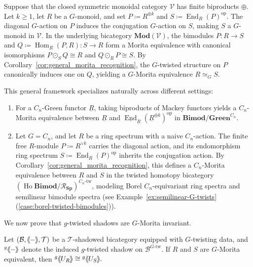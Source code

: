 \documentclass[11pt,oneside]{amsart}
\DeclareMathOperator{\Hom}{Hom}
\DeclareMathOperator{\Ho}{Ho}
\DeclareMathOperator{\End}{End}
\numberwithin{equation}{section}
\numberwithin{figure}{section}
\theoremstyle{plain}
\theoremstyle{definition}
\theoremstyle{remark}
\newcommand{\shspace}{\hspace{.5mm}} %
\newcommand{\sh}[1]{{\ensuremath{\shspace\hspace{1mm}\makebox[-1mm]{$\langle$}\makebox[0mm]{$\langle$}\hspace{1mm}{#1}\makebox[1mm]{$\rangle$}\makebox[0mm]{$\rangle$}\shspace}}}
\begin{document}
\begin{example}\label{ex:general_morita_biproduct}
Suppose that the closed symmetric monoidal category \(\mathcal V\) has finite biproducts \(\oplus\). Let \(k\geq 1\), let \(R\) be a \(G\)-monoid, and set \(P\coloneqq R^{\oplus k}\) and \(S\coloneqq \End_R(P)^{\mathrm{op}}\). The diagonal \(G\)-action on \(P\) induces the conjugation \(G\)-action on \(S\), making \(S\) a \(G\)-monoid in \(\mathcal V\). In the underlying bicategory \(\mathbf{Mod}(\mathcal V)\), the bimodules \(P\colon R\to S\) and \(Q\coloneqq\Hom_R(P,R)\colon S\to R\) form a Morita equivalence with canonical isomorphisms \(P\odot_S Q\cong R\) and \(Q\odot_R P\cong S\). By Corollary~\ref{cor:general_morita_recognition}, the \(G\)-twisted structure on \(P\) canonically induces one on \(Q\), yielding a \(G\)-Morita equivalence \(R \simeq_G S\).
\end{example}

This general framework specializes naturally across different settings:

\begin{enumerate}
\item  For a \(C_n\)-Green functor \(\underline{R}\), taking biproducts of Mackey functors yields a \(C_n\)-Morita equivalence between \(\underline{R}\) and \(\underline{\End}_{\underline{R}}(\underline{R}^{\oplus k})^{\mathrm{op}}\) in \(\mathbf{Bimod}/\mathbf{Green}^{C_n}\).
	
\item  Let \(G=C_n\), and let \(R\) be a ring spectrum with a naive \(C_n\)-action. The finite free \(R\)-module \(P\coloneqq R^{\vee k}\) carries the diagonal action, and its endomorphism ring spectrum \(S\coloneqq \End_R(P)^{\mathrm{op}}\) inherits the conjugation action. By Corollary~\ref{cor:general_morita_recognition}, this defines a \(C_n\)-Morita equivalence between \(R\) and \(S\) in the twisted homotopy bicategory \((\Ho\mathbf{Bimod}/\mathcal{R}_{\mathbf{Sp}})^{C_n\text{-tw}}\), modeling Borel \(C_n\)-equivariant ring spectra and semilinear bimodule spectra (see Example~\ref{ex:semilinear-G-twists}
\textup{(\ref{case:borel-twisted-bimodules})}).
\end{enumerate}

 



We now prove that \(g\)-twisted shadows are  $G$-Morita invariant.

\begin{prop}\label{prop:morita-invariance}
Let
\((\mathcal B,\sh{-},\mathcal T)\)
be a \(\mathcal T\)-shadowed bicategory equipped with
\(G\)-twisting data, and  
\({}^g\sh{-}\)
denote the induced \(g\)-twisted shadow on
\(\mathcal B^{G\text{-tw}}\).
If \(R\) and \(S\) are \(G\)-Morita equivalent, then
\(
{}^g\sh{U_R}\cong{}^g\sh{U_S}.
\)
\end{prop}
\end{document}
